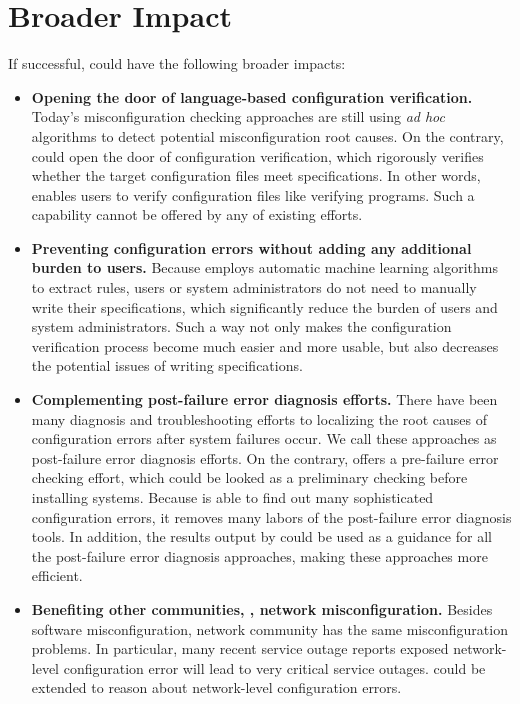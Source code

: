 
\section{Broader Impact}

If successful, \app could have the following broader impacts:

\begin{itemize}

\item {\bf Opening the door of language-based configuration verification.}
  Today's misconfiguration checking approaches are still using {\em ad hoc}
  algorithms to detect potential misconfiguration root causes. On the
  contrary, \app could open the door of configuration verification,
  which rigorously verifies whether the target configuration files meet
  specifications. In other words, \app enables users 
  to verify configuration files like verifying programs. Such a capability
  cannot be offered by any of existing efforts.

\item {\bf Preventing configuration errors without adding any additional
  burden to users.} Because \app employs automatic machine learning 
  algorithms to extract rules, users or system administrators do not need
  to manually write their specifications, which significantly reduce the
  burden of users and system administrators. Such a way not only
  makes the configuration verification process become much easier and more 
  usable, but also decreases the potential issues of writing 
  specifications.

\item {\bf Complementing post-failure error diagnosis efforts.}
  There have been many diagnosis and troubleshooting efforts to localizing
  the root causes of configuration errors after system failures occur.
  We call these approaches as post-failure error diagnosis efforts.
  On the contrary, \app offers a pre-failure error checking effort,
  which could be looked as a preliminary checking before installing
  systems. Because \app is able to find out many sophisticated 
  configuration errors, it removes many labors of 
  the post-failure error diagnosis tools. In addition, the results
  output by \app could be used as a guidance for all the post-failure
  error diagnosis approaches, making these approaches more efficient.

\item {\bf Benefiting other communities, \eg, network misconfiguration.} 
  Besides software misconfiguration, network community has the same 
  misconfiguration problems. In particular, many recent service outage 
  reports exposed network-level configuration error will lead to
  very critical service outages. \app could be extended to reason about
  network-level configuration errors.

\end{itemize}

